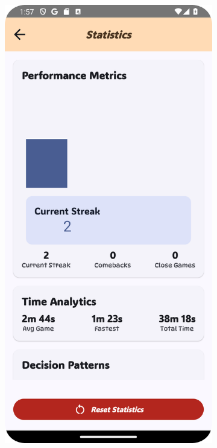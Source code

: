 \begin{figure}[ht!]
    \centering
    \begin{subfigure}[b]{0.27\textwidth}
        \includegraphics[width=\textwidth]{img/statistics screen.png}

\end{subfigure}
\end{figure}
